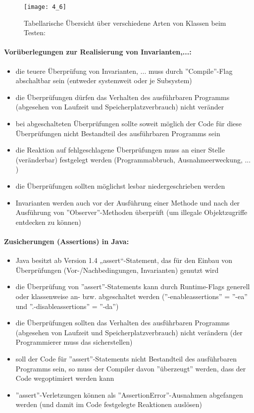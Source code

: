\begin{figure}[h]
	\centering
	\caption{Tabellarische Übersicht über verschiedene Arten von Klassen beim Testen:}
	\texttt{[image: 4\_6]}
\end{figure}

\paragraph{Vorüberlegungen zur Realisierung von Invarianten,...:}
\begin{itemize}
	\item die teuere Überprüfung von Invarianten, ... muss durch ''Compile''-Flag abschaltbar sein (entweder systemweit oder je Subsystem)
	\item die Überprüfungen dürfen das Verhalten des ausführbaren Programms (abgesehen von Laufzeit und Speicherplatzverbrauch) nicht veränder 
	\item bei abgeschalteten Überprüfungen sollte soweit möglich der Code für diese Überprüfungen nicht Bestandteil des ausführbaren Programms sein
	\item die Reaktion auf fehlgeschlagene Überprüfungen muss an einer Stelle (veränderbar) festgelegt werden (Programmabbruch, Ausnahmeerweckung, ... )
	\item die Überprüfungen sollten möglichst lesbar niedergeschrieben werden
	\item Invarianten werden auch vor der Ausführung einer Methode und nach der Ausführung von ''Observer''-Methoden überprüft (um illegale Objektzugriffe entdecken zu können)
\end{itemize}

\paragraph{Zusicherungen (Assertions) in Java:}
\begin{itemize}
	\item Java besitzt ab Version 1.4 „assert“-Statement, das für den Einbau von Überprüfungen (Vor-/Nachbedingungen, Invarianten) genutzt wird
	\item die Überprüfung von ''assert''-Statements kann durch Runtime-Flags generell oder klassenweise an- bzw. abgeschaltet werden (''-enableassertions'' = ''-ea'' und ''.-disableassertions'' = ''-da'')
	\item die Überprüfungen sollten das Verhalten des ausführbaren Programms (abgesehen von Laufzeit und Speicherplatzverbrauch) nicht verändern (der Programmierer muss das sicherstellen)
	\item soll der Code für ''assert''-Statements nicht Bestandteil des ausführbaren Programms sein, so muss der Compiler davon ''überzeugt'' werden, dass der Code wegoptimiert werden kann
	\item ''assert''-Verletzungen können als ''AssertionError''-Ausnahmen abgefangen werden (und damit im Code festgelegte Reaktionen auslösen)
\end{itemize}

